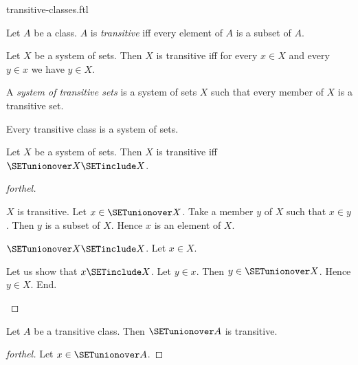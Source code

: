 \documentclass{naproche-library}
\begin{document}
\begin{smodule}[title=Transitive Classes]{transitive-classes.ftl}

\begin{definition}[forthel,id=SET_THEORY_01_8167915266244608]
  Let $A$ be a class.
  $A$ is \emph{transitive} iff every element of $A$ is a subset of $A$.
\end{definition}

\begin{proposition}[forthel,id=SET_THEORY_01_6964770955591680]
  Let $X$ be a system of sets.
  Then $X$ is transitive iff for every $x \in X$ and every $y \in x$ we have $y \in X$.
\end{proposition}

\begin{definition}[forthel,id=SET_THEORY_01_4219967964708864]
  A \emph{system of transitive sets} is a system of sets $X$ such that every member of $X$ is a transitive set.
\end{definition}

\begin{proposition}[forthel,id=SET_THEORY_01_2095807333400576]
  Every transitive class is a system of sets.
\end{proposition}

\begin{proposition}[forthel,id=SET_THEORY_01_6524117649981440]
  Let $X$ be a system of sets.
  Then $X$ is transitive iff $\SETunionover X \SETinclude X$.
\end{proposition}
\begin{proof}[forthel]
  \begin{case}{$X$ is transitive.}
    Let $x \in \SETunionover X$.
    Take a member $y$ of $X$ such that $x \in y$.
    Then $y$ is a subset of $X$.
    Hence $x$ is an element of $X$.
  \end{case}

  \begin{case}{$\SETunionover X \SETinclude X$.}
    Let $x \in X$.

    Let us show that $x \SETinclude X$.
      Let $y \in x$.
      Then $y \in \SETunionover X$.
      Hence $y \in X$.
    End.
  \end{case}
\end{proof}

\begin{proposition}[forthel,id=SET_THEORY_01_620651482185728]
  Let $A$ be a transitive class.
  Then $\SETunionover A$ is transitive.
\end{proposition}
\begin{proof}[forthel]
  Let $x \in \SETunionover A$.


\end{proof}
\end{smodule}
\end{document}
